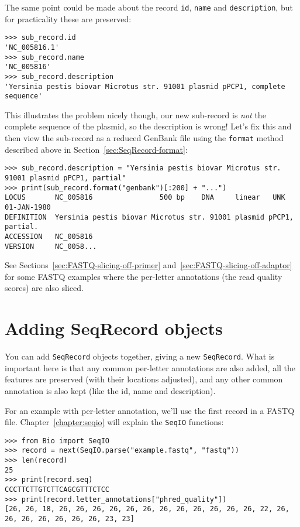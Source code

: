 The same point could be made about the record \texttt{id}, \texttt{name}
and \texttt{description}, but for practicality these are preserved:

\begin{verbatim}
>>> sub_record.id
'NC_005816.1'
>>> sub_record.name
'NC_005816'
>>> sub_record.description
'Yersinia pestis biovar Microtus str. 91001 plasmid pPCP1, complete sequence'
\end{verbatim}

\noindent This illustrates the problem nicely though, our new sub-record is
\emph{not} the complete sequence of the plasmid, so the description is wrong!
Let's fix this and then view the sub-record as a reduced GenBank file using
the \texttt{format} method described above in Section~\ref{sec:SeqRecord-format}:

\begin{verbatim}
>>> sub_record.description = "Yersinia pestis biovar Microtus str. 91001 plasmid pPCP1, partial"
>>> print(sub_record.format("genbank")[:200] + "...")
LOCUS       NC_005816                500 bp    DNA     linear   UNK 01-JAN-1980
DEFINITION  Yersinia pestis biovar Microtus str. 91001 plasmid pPCP1, partial.
ACCESSION   NC_005816
VERSION     NC_0058...
\end{verbatim}

See Sections~\ref{sec:FASTQ-slicing-off-primer}
and~\ref{sec:FASTQ-slicing-off-adaptor} for some FASTQ examples where the
per-letter annotations (the read quality scores) are also sliced.

\section{Adding SeqRecord objects}
\label{sec:SeqRecord-addition}

You can add \verb|SeqRecord| objects together, giving a new \verb|SeqRecord|.
What is important here is that any common
per-letter annotations are also added, all the features are preserved (with their
locations adjusted), and any other common annotation is also kept (like the id, name
and description).

For an example with per-letter annotation, we'll use the first record in a
FASTQ file. Chapter~\ref{chapter:seqio} will explain the \verb|SeqIO| functions:

\begin{verbatim}
>>> from Bio import SeqIO
>>> record = next(SeqIO.parse("example.fastq", "fastq"))
>>> len(record)
25
>>> print(record.seq)
CCCTTCTTGTCTTCAGCGTTTCTCC
>>> print(record.letter_annotations["phred_quality"])
[26, 26, 18, 26, 26, 26, 26, 26, 26, 26, 26, 26, 26, 26, 26, 22, 26, 26, 26, 26, 26, 26, 26, 23, 23]
\end{verbatim}

